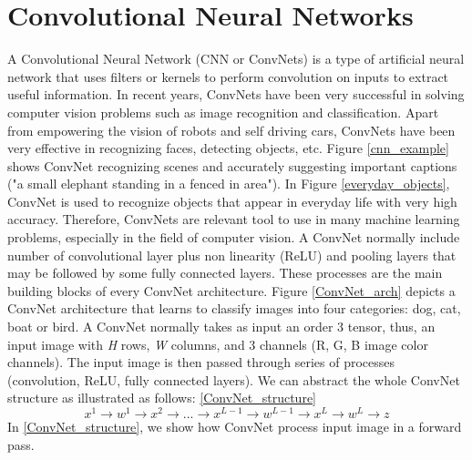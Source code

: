 \documentclass[master]{thesis-uestc}
\begin{document}
\section{Convolutional Neural Networks}
A Convolutional Neural Network (CNN or ConvNets) is a type of artificial neural network that uses filters or kernels to perform convolution on inputs to extract useful information. In recent years, ConvNets have been very successful in solving computer vision problems such as image recognition and classification. Apart from empowering the vision of robots and self driving cars, ConvNets have been very effective in recognizing faces, detecting objects, etc. Figure \ref{cnn_example} shows ConvNet recognizing scenes and accurately suggesting important captions ("a small elephant standing in a fenced in area"). In Figure \ref{everyday_objects}, ConvNet is used to recognize objects that appear in everyday life with very high accuracy. Therefore, ConvNets are relevant tool to use in many machine learning problems, especially in the field of computer vision. A ConvNet normally include number of convolutional layer plus non linearity (ReLU) and pooling layers that may be followed by some fully connected layers. These processes are the main building blocks of every ConvNet architecture. Figure \ref{ConvNet_arch} depicts a ConvNet architecture that learns to classify images into four categories: dog, cat, boat or bird. A ConvNet normally takes as input an order 3 tensor, thus, an input image with \textit{H} rows, \textit{W} columns, and 3 channels (R, G, B image color channels). The input image is then passed through series of processes (convolution, ReLU, fully connected layers). We can abstract the whole ConvNet structure as illustrated as follows: \ref{ConvNet_structure}
\begin{equation}
x^1 \rightarrow \boxed{ w^1 } \rightarrow  x^2 \rightarrow ... \rightarrow  x^{L-1} \rightarrow \boxed{ w^{L-1} } \rightarrow  x^L  \rightarrow \boxed{ w^L }  \rightarrow z
\label{ConvNet_structure}
\end{equation}
In \ref{ConvNet_structure}, we show how ConvNet process input image in a forward pass.
\end{document}
